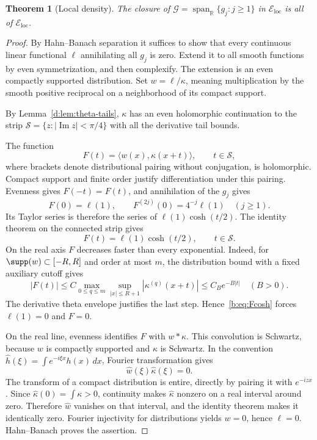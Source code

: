 \documentclass[11pt,a4paper]{article}
\numberwithin{equation}{section}
\newtheorem{theorem}{Theorem}[section]
\theoremstyle{definition}\newtheorem{definition}[theorem]{Definition}
\theoremstyle{remark}\newtheorem{remark}[theorem]{Remark}
\newcommand{\R}{\mathbb R}\newcommand{\C}{\mathbb C}\newcommand{\N}{\mathbb N}
\newcommand{\ip}[2]{\langle#1,#2\rangle}\newcommand{\norm}[1]{\lVert#1\rVert}\newcommand{\abs}[1]{\lvert#1\rvert}
\newcommand{\Eloc}{\mathcal E_{\mathrm{loc}}}\newcommand{\Def}{\mathfrak D}
\begin{document}
\begin{theorem}[Local density]\label{b:thm:density}
The closure of $\mathcal G=\operatorname{span}_{\R}\{g_j:j\ge1\}$ in $\Eloc$ is all of $\Eloc$.
\end{theorem}
\begin{proof}
By Hahn--Banach separation it suffices to show that every continuous linear functional $\ell$ annihilating all $g_j$ is zero. Extend it to all smooth functions by even symmetrization, and then complexify. The extension is an even compactly supported distribution. Set $w=\ell/\kappa$, meaning multiplication by the smooth positive reciprocal on a neighborhood of its compact support.

By Lemma~\ref{d:lem:theta-tails}, $\kappa$ has an even holomorphic continuation to the strip $\mathcal S=\{z:|\operatorname{Im}z|<\pi/4\}$ with all the derivative tail bounds.

The function
\[
 F(t)=\ip{w(x)}{\kappa(x+t)},\qquad t\in\mathcal S,
\]
where brackets denote distributional pairing without conjugation, is holomorphic. Compact support and finite order justify differentiation under this pairing. Evenness gives $F(-t)=F(t)$, and annihilation of the $g_j$ gives
\[
 F(0)=\ell(1),\qquad F^{(2j)}(0)=4^{-j}\ell(1)\quad(j\ge1).
\]
Its Taylor series is therefore the series of $\ell(1)\cosh(t/2)$. The identity theorem on the connected strip gives
\begin{equation}\label{b:eq:Fcosh}
 F(t)=\ell(1)\cosh(t/2),\qquad t\in\mathcal S.
\end{equation}
On the real axis $F$ decreases faster than every exponential. Indeed, for $\supp(w)\subset[-R,R]$ and order at most $m$, the distribution bound with a fixed auxiliary cutoff gives
\[
 |F(t)|\le C\max_{0\le q\le m}\sup_{|x|\le R+1}|\kappa^{(q)}(x+t)|
       \le C_Be^{-B|t|}\quad(B>0).
\]
The derivative theta envelope justifies the last step. Hence~\eqref{b:eq:Fcosh} forces $\ell(1)=0$ and $F=0$.

On the real line, evenness identifies $F$ with $w*\kappa$. This convolution is Schwartz, because $w$ is compactly supported and $\kappa$ is Schwartz. In the convention $\widehat h(\xi)=\int e^{-i\xi x}h(x)\,dx$, Fourier transformation gives
\[
 \widehat w(\xi)\widehat\kappa(\xi)=0.
\]
The transform of a compact distribution is entire, directly by pairing it with $e^{-izx}$. Since $\widehat\kappa(0)=\int\kappa>0$, continuity makes $\widehat\kappa$ nonzero on a real interval around zero. Therefore $\widehat w$ vanishes on that interval, and the identity theorem makes it identically zero. Fourier injectivity for distributions yields $w=0$, hence $\ell=0$. Hahn--Banach proves the assertion.
\end{proof}
\end{document}
